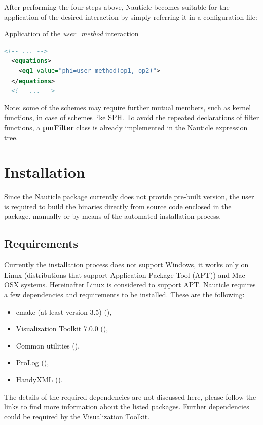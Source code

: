 \documentclass[a4paper,12pt,openany]{book}
\newcommand{\myhref}[3][nauticlegreen_dark]{\href{#2}{\color{#1}{#3}}}%
\theoremstyle{break}
\begin{document}
After performing the four steps above, Nauticle becomes suitable for the application of the desired interaction by simply referring it in a configuration file:
\begin{example}{Application of the \textit{user\_method} interaction}{}
\lstset{basicstyle=\tiny}
\begin{lstlisting}[language=XML]
  <!-- ... -->
  <equations>
    <eq1 value="phi=user_method(op1, op2)">
  </equations>
  <!-- ... -->
\end{lstlisting}
\end{example}

Note: some of the schemes may require further mutual members, such as kernel functions, in case of schemes like SPH. To avoid the repeated declarations of filter functions, a \textbf{pmFilter} class is already implemented in the Nauticle expression tree.


\section{Installation}
Since the Nauticle package currently does not provide pre-built version, the user is required to build the binaries directly from source code enclosed in the package. manually or by means of the automated installation process.
\subsection{Requirements}
Currently the installation process does not support Windows, it works only on Linux (distributions that support Application Package Tool (APT)) and Mac OSX systems. Hereinafter Linux is considered to support APT.
Nauticle requires a few dependencies and requirements to be installed. These are the following:
\begin{itemize}
  \item cmake (at least version 3.5) (\myhref{https://cmake.org/download/}{https://cmake.org/download/}),
  \item Visualization Toolkit 7.0.0 (\myhref{http://www.vtk.org/files/release/7.0/VTK-7.0.0.zip}{http://www.vtk.org/files/release/7.0/VTK-7.0.0.zip}),
  \item Common utilities (\myhref{https://bitbucket.org/BalazsToth/commonutils}{https://bitbucket.org/BalazsToth/commonutils}),
  \item ProLog (\myhref{https://bitbucket.org/BalazsToth/prolog}{https://bitbucket.org/BalazsToth/prolog}),
  \item HandyXML (\myhref{https://bitbucket.org/BalazsToth/handyxml}{https://bitbucket.org/BalazsToth/handyxml}).
\end{itemize}
The details of the required dependencies are not discussed here, please follow the links to find more information about the listed packages. Further dependencies could be required by the Visualization Toolkit.
\end{document}
